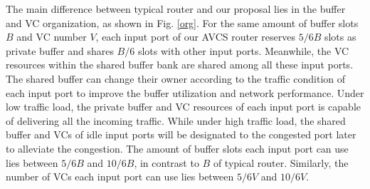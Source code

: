 \documentclass[paper]{ieice}
\begin{document}
The main difference between typical router and our proposal lies in the buffer and VC organization, as shown in Fig. \ref{org}. For the same amount of buffer slots $B$ and VC number $V$, each input port of our AVCS router reserves $5/6B$ slots as private buffer and shares $B/6$ slots with other input ports. Meanwhile, the VC resources within the shared buffer bank are shared among all these input ports. The shared buffer can change their owner according to the traffic condition of each input port to improve the buffer utilization and network performance. Under low traffic load, the private buffer and VC resources of each input port is capable of delivering all the incoming traffic. While under high traffic load, the shared buffer and VCs of idle input ports will be designated to the congested port later to alleviate the congestion. The amount of buffer slots each input port can use lies between $5/6B$ and $10/6B$, in contrast to $B$ of typical router. Similarly, the number of VCs each input port can use lies between $5/6V$ and $10/6V$.
\end{document}
